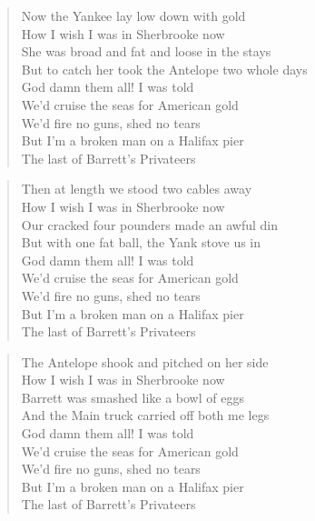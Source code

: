 \documentclass[8pt,twoside]{extarticle}
\newenvironment{xverse}{
	\interlinepenalty 10000
	\begin{verse}
	\begin{minipage}{\linewidth}
	\parskip 5pt
	\vspace{-6pt}
	}
	{
	\end{minipage}
	\end{verse}
	\penalty 0
	\vspace{-6pt}
	}
\begin{document}
\begin{xverse}
Now the Yankee lay low down with gold \\
How I wish I was in Sherbrooke now \\
She was broad and fat and loose in the stays \\
But to catch her took the Antelope two whole days \\
God damn them all! I was told \\
We’d cruise the seas for American gold \\
We’d fire no guns, shed no tears \\
But I’m a broken man on a Halifax pier \\
The last of Barrett’s Privateers \\
\end{xverse}

\begin{xverse}
Then at length we stood two cables away \\
How I wish I was in Sherbrooke now \\
Our cracked four pounders made an awful din \\
But with one fat ball, the Yank stove us in \\
God damn them all! I was told \\
We’d cruise the seas for American gold \\
We’d fire no guns, shed no tears \\
But I’m a broken man on a Halifax pier \\
The last of Barrett’s Privateers \\
\end{xverse}

\begin{xverse}
The Antelope shook and pitched on her side \\
How I wish I was in Sherbrooke now \\
Barrett was smashed like a bowl of eggs \\
And the Main truck carried off both me legs \\
God damn them all! I was told \\
We’d cruise the seas for American gold \\
We’d fire no guns, shed no tears \\
But I’m a broken man on a Halifax pier \\
The last of Barrett’s Privateers \\
\end{xverse}
\end{document}
